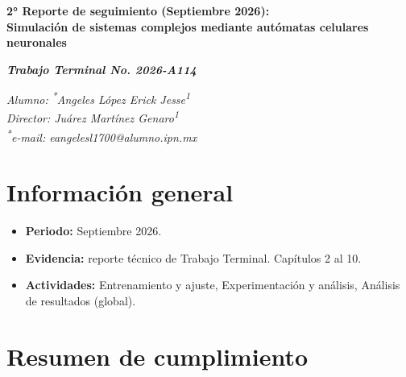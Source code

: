 \documentclass[letterpaper,10pt,oneside]{article}
\newcommand\authormark[1]{\textsuperscript{#1}}
\def\numReporte{2}
\def\mes{Septiembre}
\begin{document}
	\begin{center}
		\fontsize{14}{16}\selectfont\bfseries
		\numReporte° Reporte de seguimiento (\mes{} 2026): \\
		Simulación de sistemas complejos mediante autómatas celulares neuronales
	\end{center}

	\begin{center}
		\fontsize{14}{16}\selectfont\bfseries
		\textit{Trabajo Terminal No. 2026-A114}
	\end{center}

	\begin{center}
		\fontsize{12}{16}\selectfont
		\textit{Alumno: \authormark{*}Angeles López Erick Jesse\authormark{1}} \\
		\textit{Director: Juárez Martínez Genaro\authormark{1}} \\
		\textit{\authormark{*}e-mail: eangelesl1700@alumno.ipn.mx}
	\end{center}

	\section{Información general}

	\begin{itemize}[leftmargin=*]
		\item \textbf{Periodo:} \mes{} 2026.
		\item \textbf{Evidencia:} reporte técnico de Trabajo Terminal. Capítulos 2 al 10.
		\item \textbf{Actividades:} Entrenamiento y ajuste, Experimentación y análisis, Análisis de resultados (global).
	\end{itemize}

	\section{Resumen de cumplimiento}
\end{document}
